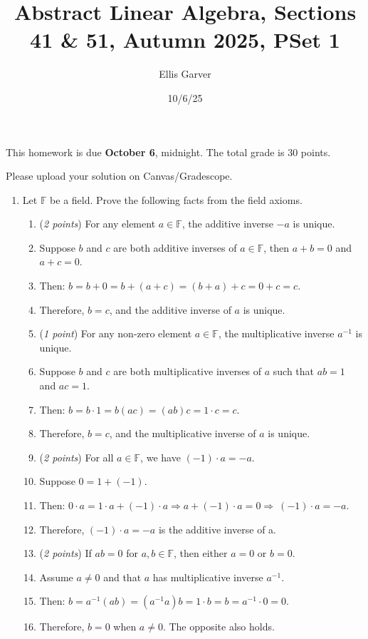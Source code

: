 \documentclass[11pt]{article}
\newcommand{\bbF}{\mathbb{F}}
\theoremstyle{definition}
\numberwithin{equation}{subsection}
\begin{document}
\pagestyle{plain}


\setcounter{section}{1}   

\title{Abstract Linear Algebra, Sections 41 \& 51, Autumn 2025, PSet 1} 
\date{10/6/25}
\author{Ellis Garver}
\maketitle
\item[]
This homework is due {\bf October 6}, midnight. The total grade is 30 points. 
\item Please upload your solution on Canvas/Gradescope.

\begin{enumerate}

\item Let $\bbF$ be a field. Prove the following facts from the field axioms.
\begin{enumerate}

\item (\emph{2 points}) For any element $a \in \bbF$, the additive inverse $-a$ is unique.
\item[] Suppose $b$ and $c$ are both additive inverses of $a \in \bbF$, then $a+b=0$ and $a+c=0$.
\item[] Then: $b=b+0=b+(a+c)=(b+a)+c=0+c=c$.
\item[] Therefore, $b=c$, and the additive inverse of $a$ is unique.
\item (\emph{1 point}) For any non-zero element $a \in \bbF$, the multiplicative inverse $a^{-1}$ is unique.
\item[] Suppose $b$ and $c$ are both multiplicative inverses of $a$ such that $ab=1$ and $ac=1$.
\item[] Then: $b=b\cdot1=b(ac)=(ab)c=1\cdot c=c$.
\item[] Therefore, $b=c$, and the multiplicative inverse of $a$ is unique.
\item (\emph{2 points}) For all $a\in \bbF$, we have $(-1) \cdot a = -a$.
\item[] Suppose $0=1+(-1)$.
\item[] Then: $0\cdot a=1\cdot a+(-1)\cdot a\Rightarrow
a+(-1)\cdot a=0\Rightarrow\ (-1)\cdot a=-a$.
\item[] Therefore, $(-1)\cdot a=-a$ is the additive inverse of a.
\item (\emph{2 points}) If $ab=0$ for $a,b\in \bbF$, then either $a=0$ or $b=0$.
\item[] Assume $a\neq 0$ and that $a$ has multiplicative inverse $a^{-1}$.
\item[] Then: $b=a^{-1}(ab)=(a^{-1}a)b=1\cdot b=b=a^{-1}\cdot 0=0$.
\item[] Therefore, $b=0$ when $a\neq 0$. The opposite also holds.
\end{enumerate}


\end{enumerate}
\end{document}

